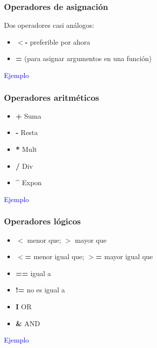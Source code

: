 \documentclass{beamer}
\begin{document}
 \begin{frame}
 \frametitle{Operadores de asignaci\'on}
 Dos operadores casi an\'alogos:
      \begin{itemize}
 	    \item \textbf{$<$-} preferible por ahora
	    \item \textbf{=} (para asignar argumentos en una funci\'on)
  	   \end{itemize}
  	   \textcolor{blue}{Ejemplo}
\lst
\end{frame}


 \begin{frame}
 \frametitle{Operadores aritm\'eticos}
      \begin{itemize}
 	    \item \textbf{+}    Suma
	    \item \textbf{-}    Resta
	    \item \textbf{*}    Mult
	    \item \textbf{/}    Div
	    \item \textbf{\^{}} Expon
  	   \end{itemize}
  	   \textcolor{blue}{Ejemplo}
\lst
\end{frame}


 \begin{frame}
 \frametitle{Operadores l\'ogicos}
      \begin{itemize}
 	    \item \textbf{$<$} menor que; \textbf{$>$} mayor que
 	    \item \textbf{$<$=} menor igual que; \textbf{$>$=} mayor igual que
 	    \item \textbf{==} igual a
 	    \item \textbf{!=} no es igual a
 	    \item \textbf{I} OR
 	    \item \textbf{\&} AND
  	   \end{itemize}
  	   \textcolor{blue}{Ejemplo}
\lst
\end{frame}
\end{document}
